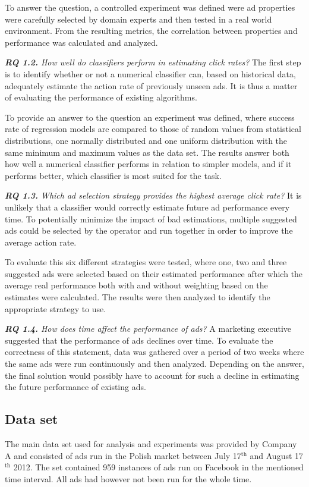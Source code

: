 \documentclass{sig-alternate}
\newcommand{\superscript}[1]{\ensuremath{^{\textrm{#1}}}}
\begin{document}
To answer the question, a controlled experiment was defined were ad properties were carefully selected by domain experts and then tested in a real world environment. From the resulting metrics, the correlation between properties and performance was calculated and analyzed.

\textit{\textbf{RQ 1.2.} How well do classifiers perform in estimating click rates?}
The first step is to identify whether or not a numerical classifier can, based on historical data, adequately estimate the action rate of previously unseen ads. It is thus a matter of evaluating the performance of existing algorithms.

To provide an answer to the question an experiment was defined, where success rate of regression models are compared to those of random values from statistical distributions, one normally distributed and one uniform distribution with the same minimum and maximum values as the data set. The results answer both how well a numerical classifier performs in relation to simpler models, and if it performs better, which classifier is most suited for the task.

\textit{\textbf{RQ 1.3.} Which ad selection strategy provides the highest average click rate?}
It is unlikely that a classifier would correctly estimate future ad performance every time. To potentially minimize the impact of bad estimations, multiple suggested ads could be selected by the operator and run together in order to improve the average action rate.

To evaluate this six different strategies were tested, where one, two and three suggested ads were selected based on their estimated performance after which the average real performance both with and without weighting based on the estimates were calculated. The results were then analyzed to identify the appropriate strategy to use.

\textit{\textbf{RQ 1.4.} How does time affect the performance of ads?}
A marketing executive suggested that the performance of ads declines over time. To evaluate the correctness of this statement, data was gathered over a period of two weeks where the same ads were run continuously and then analyzed. Depending on the answer, the final solution would possibly have to account for such a decline in estimating the future performance of existing ads.

\subsection{Data set}
The main data set used for analysis and experiments was provided by Company A and consisted of ads run in the Polish market between July 17\superscript{th} and August 17\superscript{th} 2012. The set contained 959 instances of ads run on Facebook in the mentioned time interval. All ads had however not been run for the whole time.
\end{document}
